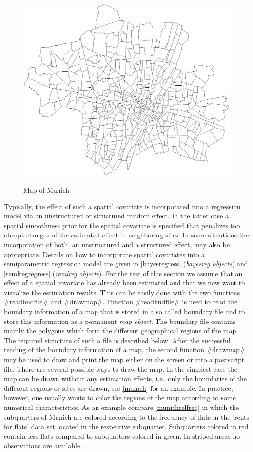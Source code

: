 \begin{figure}
\centering
\includegraphics [scale=0.5]{grafiken/munich.eps}
{\em\caption{\label{munich} Map of Munich}}
\end{figure}


Typically, the effect of such a spatial covariate is incorporated
into a regression model via an unstructured or structured random
effect. In the latter case a spatial smoothness prior for the
spatial covariate is specified that penalizes too abrupt changes of
the estimated effect in neighboring sites. In some situations the
incorporation of both, an unstructured and a structured effect, may
also be appropriate. Details on how to incorporate spatial
covariates into a semiparametric regression  model are given in
\autoref{bayesregress} ({\em bayesreg objects}) and
\autoref{remlregregress} ({\em remlreg objects}). For the rest of
this section we assume that an effect of a spatial covariate has
already been estimated and that we now want to visualize the
estimation results. This can be easily done with the two functions
#readbndfile# and #drawmap#. Function #readbndfile# is used to read
the boundary information of a map that is stored in a so called
boundary file and to store this information as a permanent {\em map
object}. The boundary file contains mainly the polygons which form
the different geographical regions of the map. The required
structure of such a file is described below. After the successful
reading of the boundary information of a map, the second function
#drawmap# may be used to draw and print the map either on the screen
or into a postscript file. There are several possible ways to draw
the map. In the simplest case the map can be drawn without any
estimation effects, i.e.~only the boundaries of the different
regions or sites are drawn, see \autoref{munich} for an example. In
practice, however, one usually wants to color the regions of the map
according to some numerical characteristics. As an example compare
\autoref{munichrelfreq} in which the subquarters of Munich are
colored according to the frequency of flats in the 'rents for flats'
data set located in the respective subquarter. Subquarters colored
in red contain less flats compared to subquarters colored in green.
In striped areas no observations are available.

